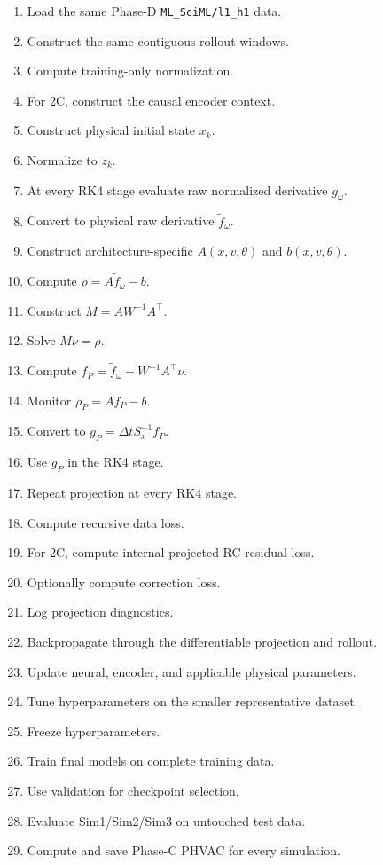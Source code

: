 \documentclass[11pt]{article}
\begin{document}
\begin{enumerate}
\item Load the same Phase-D \texttt{ML\_SciML/l1\_h1} data.
\item Construct the same contiguous rollout windows.
\item Compute training-only normalization.
\item For 2C, construct the causal encoder context.
\item Construct physical initial state \(x_k\).
\item Normalize to \(z_k\).
\item At every RK4 stage evaluate raw normalized derivative \(g_\omega\).
\item Convert to physical raw derivative \(\widetilde f_\omega\).
\item Construct architecture-specific \(A(x,v,\theta)\) and \(b(x,v,\theta)\).
\item Compute \(\rho=A\widetilde f_\omega-b\).
\item Construct \(M=AW^{-1}A^\top\).
\item Solve \(M\nu=\rho\).
\item Compute \(f_P=\widetilde f_\omega-W^{-1}A^\top\nu\).
\item Monitor \(\rho_P=Af_P-b\).
\item Convert to \(g_P=\Delta tS_x^{-1}f_P\).
\item Use \(g_P\) in the RK4 stage.
\item Repeat projection at every RK4 stage.
\item Compute recursive data loss.
\item For 2C, compute internal projected RC residual loss.
\item Optionally compute correction loss.
\item Log projection diagnostics.
\item Backpropagate through the differentiable projection and rollout.
\item Update neural, encoder, and applicable physical parameters.
\item Tune hyperparameters on the smaller representative dataset.
\item Freeze hyperparameters.
\item Train final models on complete training data.
\item Use validation for checkpoint selection.
\item Evaluate Sim1/Sim2/Sim3 on untouched test data.
\item Compute and save Phase-C PHVAC for every simulation.
\end{enumerate}
\end{document}
